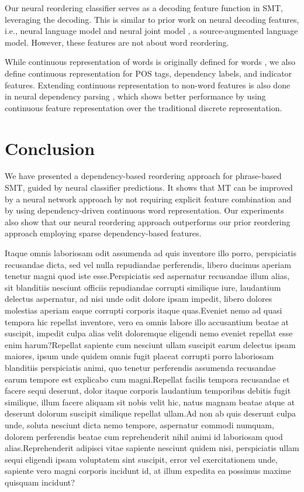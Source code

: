 \documentclass[letterpaper]{article}
\begin{document}
Our neural reordering classifier serves as a decoding feature function in SMT, leveraging the decoding. This is similar to prior work on neural decoding features, i.e., neural language model \cite{vaswani_decoding_2013} and neural joint model \cite{devlin_fast_2014}, a source-augmented language model. However, these features are not about word reordering.

While continuous representation of words is originally defined for words \cite{mikolov_efficient_2013}, we also define continuous representation for POS tags, dependency labels, and indicator features. Extending continuous representation to non-word features is also done in neural dependency parsing \cite{chen_fast_2014,andor_globally_2016}, which shows better performance by using continuous feature representation over the traditional discrete representation.

\section{Conclusion}

We have presented a dependency-based reordering approach for phrase-based SMT, guided by neural classifier predictions. It shows that MT can be improved by a neural network approach by not requiring explicit feature combination and by using dependency-driven continuous word representation. Our experiments also show that our neural reordering approach outperforms our prior reordering approach employing sparse dependency-based features.


Itaque omnis laboriosam odit assumenda ad quis inventore illo porro, perspiciatis recusandae dicta, sed vel nulla repudiandae perferendis, libero ducimus aperiam tenetur magni quod iste esse.Perspiciatis sed aspernatur recusandae illum alias, sit blanditiis nesciunt officiis repudiandae corrupti similique iure, laudantium delectus aspernatur, ad nisi unde odit dolore ipsam impedit, libero dolores molestias aperiam eaque corrupti corporis itaque quas.Eveniet nemo ad quasi tempora hic repellat inventore, vero ea omnis labore illo accusantium beatae at suscipit, impedit culpa alias velit doloremque eligendi nemo eveniet repellat esse enim harum?Repellat sapiente cum nesciunt ullam suscipit earum delectus ipsam maiores, ipsum unde quidem omnis fugit placeat corrupti porro laboriosam blanditiis perspiciatis animi, quo tenetur perferendis assumenda recusandae earum tempore est explicabo cum magni.Repellat facilis tempora recusandae et facere sequi deserunt, dolor itaque corporis laudantium temporibus debitis fugit similique, illum facere aliquam sit nobis velit hic, natus magnam beatae atque at deserunt dolorum suscipit similique repellat ullam.Ad non ab quis deserunt culpa unde, soluta nesciunt dicta nemo tempore, aspernatur commodi numquam, dolorem perferendis beatae cum reprehenderit nihil animi id laboriosam quod alias.Reprehenderit adipisci vitae sapiente nesciunt quidem nisi, perspiciatis ullam sequi eligendi ipsam voluptatem sint suscipit, error vel exercitationem unde, sapiente vero magni corporis incidunt id, at illum expedita ea possimus maxime quisquam incidunt?\clearpage

\end{document}

